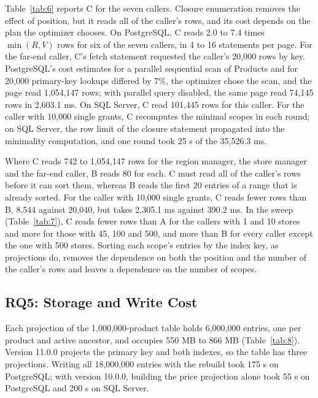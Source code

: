 \documentclass[conference]{IEEEtran}
\begin{document}
Table~\ref{tab:6} reports C for the seven callers. Closure enumeration removes the effect of position, but it reads all of the caller's rows, and its cost depends on the plan the optimizer chooses. On PostgreSQL, C reads 2.0 to 7.4 times \(\min(R, V)\) rows for six of the seven callers, in 4 to 16 statements per page. For the far-end caller, C's fetch statement requested the caller's 20,000 rows by key. PostgreSQL's cost estimates for a parallel sequential scan of Products and for 20,000 primary-key lookups differed by 7\%, the optimizer chose the scan, and the page read 1,054,147 rows; with parallel query disabled, the same page read 74,145 rows in 2,603.1 ms. On SQL Server, C read 101,445 rows for this caller. For the caller with 10,000 single grants, C recomputes the minimal scopes in each round; on SQL Server, the row limit of the closure statement propagated into the minimality computation, and one round took 25 s of the 35,526.3 ms.

Where C reads 742 to 1,054,147 rows for the region manager, the store manager and the far-end caller, B reads 80 for each. C must read all of the caller's rows before it can sort them, whereas B reads the first 20 entries of a range that is already sorted. For the caller with 10,000 single grants, C reads fewer rows than B, 8,544 against 20,040, but takes 2,305.1 ms against 390.2 ms. In the sweep (Table~\ref{tab:7}), C reads fewer rows than A for the callers with 1 and 10 stores and more for those with 45, 100 and 500, and more than B for every caller except the one with 500 stores. Sorting each scope's entries by the index key, as projections do, removes the dependence on both the position and the number of the caller's rows and leaves a dependence on the number of scopes.

\subsection{RQ5: Storage and Write Cost}\label{sec-7-7}

Each projection of the 1,000,000-product table holds 6,000,000 entries, one per product and active ancestor, and occupies 550 MB to 866 MB (Table~\ref{tab:8}). Version 11.0.0 projects the primary key and both indexes, so the table has three projections. Writing all 18,000,000 entries with the rebuild took 175 s on PostgreSQL; with version 10.0.0, building the price projection alone took 55 s on PostgreSQL and 200 s on SQL Server.
\end{document}
